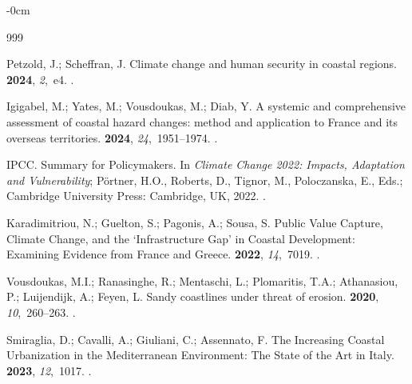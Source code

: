 \documentclass[coasts,article,accept,pdftex,moreauthors]{Definitions/mdpi}
\begin{document}
\begin{adjustwidth}{-\extralength}{0cm}

%
\begin{thebibliography}{999}

Petzold, J.; Scheffran, J.
\newblock Climate change and human security in coastal regions.
 {\bf 2024}, {\em 2},~e4.
.

Igigabel, M.; Yates, M.; Vousdoukas, M.; Diab, Y.
\newblock A systemic and comprehensive assessment of coastal hazard changes:
  method and application to {France} and its overseas territories.
 {\bf 2024}, {\em
  24},~1951--1974.
.

{IPCC}.
\newblock Summary for Policymakers. In {\em Climate Change 2022: Impacts,
  Adaptation and Vulnerability}; P{\"o}rtner, H.O., Roberts, D., Tignor, M.,
  Poloczanska, E., Eds.; Cambridge University Press: Cambridge, UK,  2022.
.

Karadimitriou, N.; Guelton, S.; Pagonis, A.; Sousa, S.
\newblock Public Value Capture, Climate Change, and the `Infrastructure Gap' in
  Coastal Development: Examining Evidence from {France} and {Greece}.
 {\bf 2022}, {\em 14},~7019.
.

Vousdoukas, M.I.; Ranasinghe, R.; Mentaschi, L.; Plomaritis, T.A.; Athanasiou,
  P.; Luijendijk, A.; Feyen, L.
\newblock Sandy coastlines under threat of erosion.
 {\bf 2020}, {\em 10},~260--263.
.

Smiraglia, D.; Cavalli, A.; Giuliani, C.; Assennato, F.
\newblock The Increasing Coastal Urbanization in the {Mediterranean}
  Environment: The State of the Art in {Italy}.
 {\bf 2023}, {\em 12},~1017.
.


\end{thebibliography}
\end{adjustwidth}
\end{document}
